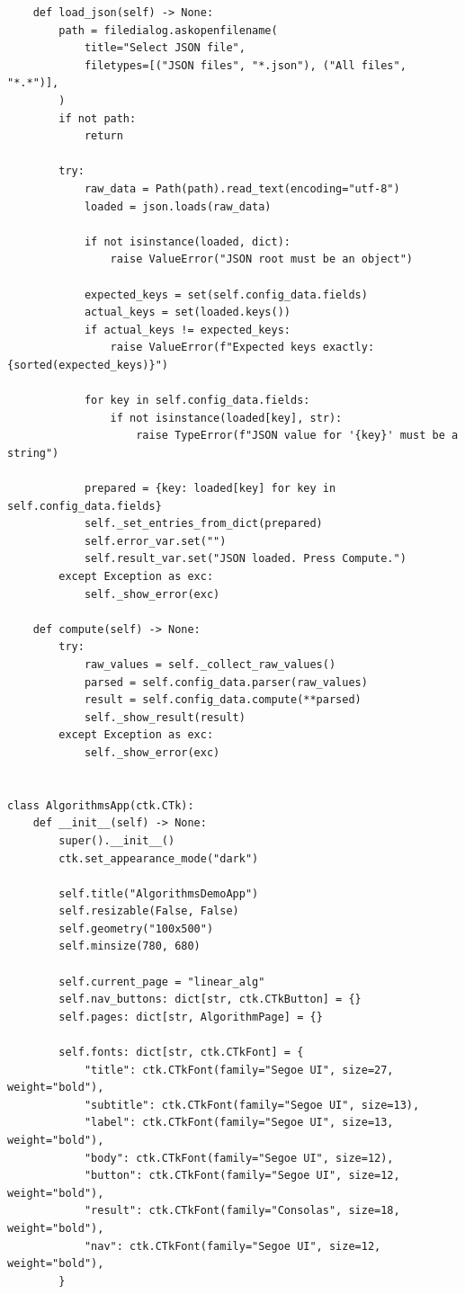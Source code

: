 \documentclass[12pt,a4paper]{article}
\begin{document}
\begin{verbatim}
    def load_json(self) -> None:
        path = filedialog.askopenfilename(
            title="Select JSON file",
            filetypes=[("JSON files", "*.json"), ("All files", "*.*")],
        )
        if not path:
            return

        try:
            raw_data = Path(path).read_text(encoding="utf-8")
            loaded = json.loads(raw_data)

            if not isinstance(loaded, dict):
                raise ValueError("JSON root must be an object")

            expected_keys = set(self.config_data.fields)
            actual_keys = set(loaded.keys())
            if actual_keys != expected_keys:
                raise ValueError(f"Expected keys exactly: {sorted(expected_keys)}")

            for key in self.config_data.fields:
                if not isinstance(loaded[key], str):
                    raise TypeError(f"JSON value for '{key}' must be a string")

            prepared = {key: loaded[key] for key in self.config_data.fields}
            self._set_entries_from_dict(prepared)
            self.error_var.set("")
            self.result_var.set("JSON loaded. Press Compute.")
        except Exception as exc:
            self._show_error(exc)

    def compute(self) -> None:
        try:
            raw_values = self._collect_raw_values()
            parsed = self.config_data.parser(raw_values)
            result = self.config_data.compute(**parsed)
            self._show_result(result)
        except Exception as exc:
            self._show_error(exc)


class AlgorithmsApp(ctk.CTk):
    def __init__(self) -> None:
        super().__init__()
        ctk.set_appearance_mode("dark")

        self.title("AlgorithmsDemoApp")
        self.resizable(False, False)
        self.geometry("100x500")
        self.minsize(780, 680)

        self.current_page = "linear_alg"
        self.nav_buttons: dict[str, ctk.CTkButton] = {}
        self.pages: dict[str, AlgorithmPage] = {}

        self.fonts: dict[str, ctk.CTkFont] = {
            "title": ctk.CTkFont(family="Segoe UI", size=27, weight="bold"),
            "subtitle": ctk.CTkFont(family="Segoe UI", size=13),
            "label": ctk.CTkFont(family="Segoe UI", size=13, weight="bold"),
            "body": ctk.CTkFont(family="Segoe UI", size=12),
            "button": ctk.CTkFont(family="Segoe UI", size=12, weight="bold"),
            "result": ctk.CTkFont(family="Consolas", size=18, weight="bold"),
            "nav": ctk.CTkFont(family="Segoe UI", size=12, weight="bold"),
        }


\end{verbatim}
\end{document}
